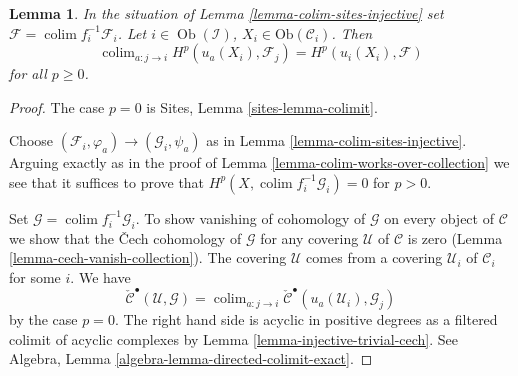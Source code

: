 \documentclass[10pt,a4paper]{amsart}
\theoremstyle{plain}
\newtheorem{lemma}[subsection]{Lemma}
\theoremstyle{definition}
\theoremstyle{remark}
\numberwithin{equation}{subsection}
\def\colim{\mathop{\mathrm{colim}}\nolimits}
\def\Ob{\mathop{\mathrm{Ob}}\nolimits}
\begin{document}
\begin{lemma}
\label{lemma-colimit}
In the situation of Lemma \ref{lemma-colim-sites-injective} set
$\mathcal{F} = \colim f_i^{-1}\mathcal{F}_i$.
Let $i \in \Ob(\mathcal{I})$, $X_i \in \text{Ob}(\mathcal{C}_i)$. Then
$$
\colim_{a : j \to i} H^p(u_a(X_i), \mathcal{F}_j) =
H^p(u_i(X_i), \mathcal{F})
$$
for all $p \geq 0$.
\end{lemma}

\begin{proof}
The case $p = 0$ is Sites, Lemma \ref{sites-lemma-colimit}.

\medskip\noindent
Choose $(\mathcal{F}_i, \varphi_a) \to (\mathcal{G}_i, \psi_a)$
as in Lemma \ref{lemma-colim-sites-injective}.
Arguing exactly as in the proof of
Lemma \ref{lemma-colim-works-over-collection}
we see that it suffices to prove that
$H^p(X, \colim f_i^{-1}\mathcal{G}_i) = 0$ for $p > 0$.

\medskip\noindent
Set $\mathcal{G} = \colim f_i^{-1}\mathcal{G}_i$.
To show vanishing of cohomology of $\mathcal{G}$ on every object
of $\mathcal{C}$ we show that the {\v C}ech cohomology of $\mathcal{G}$
for any covering $\mathcal{U}$ of $\mathcal{C}$ is zero
(Lemma \ref{lemma-cech-vanish-collection}).
The covering $\mathcal{U}$ comes from a covering
$\mathcal{U}_i$ of $\mathcal{C}_i$ for some $i$. We have
$$
\check{\mathcal{C}}^\bullet(\mathcal{U}, \mathcal{G}) =
\colim_{a : j \to i}
\check{\mathcal{C}}^\bullet(u_a(\mathcal{U}_i), \mathcal{G}_j)
$$
by the case $p = 0$. The right hand side is acyclic in positive degrees
as a filtered colimit of acyclic complexes by
Lemma \ref{lemma-injective-trivial-cech}. See
Algebra, Lemma \ref{algebra-lemma-directed-colimit-exact}.
\end{proof}
\end{document}
